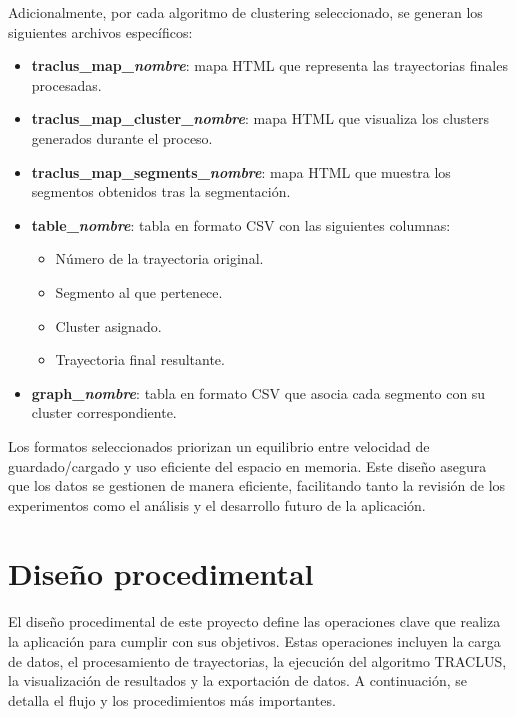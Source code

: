 Adicionalmente, por cada algoritmo de clustering seleccionado, se generan los siguientes archivos específicos:

\begin{itemize}
	\item \textbf{traclus\_map\_\textit{nombre}}: mapa HTML que representa las trayectorias finales procesadas.
	\item \textbf{traclus\_map\_cluster\_\textit{nombre}}: mapa HTML que visualiza los clusters generados durante el proceso.
	\item \textbf{traclus\_map\_segments\_\textit{nombre}}: mapa HTML que muestra los segmentos obtenidos tras la segmentación.
	\item \textbf{table\_\textit{nombre}}: tabla en formato CSV con las siguientes columnas:
	\begin{itemize}
		\item Número de la trayectoria original.
		\item Segmento al que pertenece.
		\item Cluster asignado.
		\item Trayectoria final resultante.
	\end{itemize}
	\item \textbf{graph\_\textit{nombre}}: tabla en formato CSV que asocia cada segmento con su cluster correspondiente.
\end{itemize}

Los formatos seleccionados priorizan un equilibrio entre velocidad de guardado/cargado y uso eficiente del espacio en memoria. Este diseño asegura que los datos se gestionen de manera eficiente, facilitando tanto la revisión de los experimentos como el análisis y el desarrollo futuro de la aplicación.

\section{Diseño procedimental}

El diseño procedimental de este proyecto define las operaciones clave que realiza la aplicación para cumplir con sus objetivos. Estas operaciones incluyen la carga de datos, el procesamiento de trayectorias, la ejecución del algoritmo TRACLUS, la visualización de resultados y la exportación de datos. A continuación, se detalla el flujo y los procedimientos más importantes.

